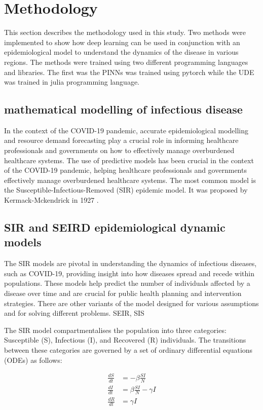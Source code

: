 \documentclass[12pt]{article}
\begin{document}
\section{Methodology}
This section describes the methodology used in this study. Two methods were implemented to show how deep learning can be used in conjunction with an epidemiological model to understand the dynamics of the disease in various regions. The methods were trained using two different programming languages and libraries. The first was the PINNs was trained using pytorch while the UDE was trained in julia programming language.

\subsection{mathematical modelling of infectious disease}
In the context of the COVID-19 pandemic, accurate epidemiological modelling and resource demand forecasting play a crucial role in informing healthcare professionals and governments on how to effectively manage overburdened healthcare systems. The use of predictive models has been crucial in the context of the COVID-19 pandemic, helping healthcare professionals and governments effectively manage overburdened healthcare systems. The most common model is the Susceptible-Infectious-Removed (SIR) epidemic model. It was proposed by Kermack-Mckendrick in 1927 \cite{kermack1927contribution}. 

\subsection{SIR and SEIRD epidemiological dynamic models}
The SIR models are pivotal in understanding the dynamics of infectious diseases, such as COVID-19, providing insight into how diseases spread and recede within populations. These models help predict the number of individuals affected by a disease over time and are crucial for public health planning and intervention strategies. There are other variants of the model designed for various assumptions and for solving different problems. SEIR, SIS    

The SIR model compartmentalises the population into three categories: Susceptible (S), Infectious (I), and Recovered (R) individuals. The transitions between these categories are governed by a set of ordinary differential equations (ODEs) as follows:

\begin{equation}
    \begin{align}
        \frac{dS}{dt} &= -\beta \frac{SI}{N} \\
        \frac{dI}{dt} &= \beta \frac{SI}{N} - \gamma I \\
        \frac{dR}{dt} &= \gamma I
    \end{align}
\end{equation}
\end{document}
